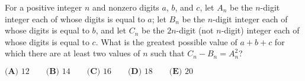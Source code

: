 \documentclass[preview]{standalone}
\begin{document}
\color{white}
For a positive integer $n$ and nonzero digits $a$, $b$, and $c$, let $A_n$ be the $n$-digit integer each of whose digits is equal to $a$; let $B_n$ be the $n$-digit integer each of whose digits is equal to $b$, and let $C_n$ be the $2n$-digit (not $n$-digit) integer each of whose digits is equal to $c$. What is the greatest possible value of $a + b + c$ for which there are at least two values of $n$ such that $C_n - B_n = A_n^2$?

$\textbf{(A)} \text{ 12} \qquad \textbf{(B)} \text{ 14} \qquad \textbf{(C)} \text{ 16} \qquad \textbf{(D)} \text{ 18} \qquad \textbf{(E)} \text{ 20}$
\end{document}
